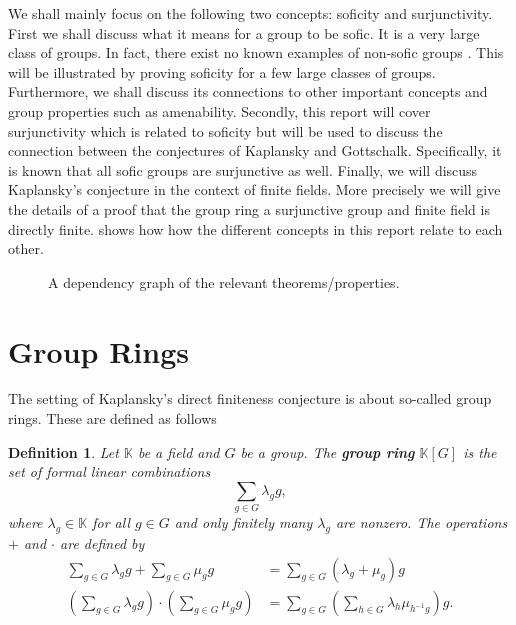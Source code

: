 \documentclass[titlepage, a4paper]{article}
\newcommand{\F}{\mathbb{F}}
\newtheorem{definition}[theorem]{Definition}
\theoremstyle{remark}
\begin{document}
We shall mainly focus on the following two concepts: soficity and surjunctivity. First we shall discuss what it means for a group to be sofic. It is a very large class of groups. In fact, there exist no known examples of non-sofic groups \cite[introduction]{weiss_2000}. This will be illustrated by proving soficity for a few large classes of groups. Furthermore, we shall discuss its connections to other important concepts and group properties such as amenability. Secondly, this report will cover surjunctivity which is related to soficity but will be used to discuss the connection between the conjectures of Kaplansky and Gottschalk. Specifically, it is known that all sofic groups are surjunctive as well.
Finally, we will discuss Kaplansky's conjecture in the context of finite fields. More precisely we will give the details of a proof that the group ring a surjunctive group and finite field is directly finite.  shows how how the different concepts in this report relate to each other.


\begin{figure}[h]
	\centering
{}
\caption{A dependency graph of the relevant theorems/properties. }
\label{fig:dependency_graph}
\end{figure}
\section{Group Rings}\label{sec:group_rings} 

The setting of Kaplansky's direct finiteness conjecture is about so-called group rings. These are defined as follows


\begin{definition}\label{def:group_ring}
	Let $\mathbb K$ be a field and $G$ be a group. The \textbf{group ring} $\mathbb K[G]$ is the set of formal linear combinations
    \[
        \sum_{g \in G} \lambda_g g,
    \]
    where $\lambda_g \in \mathbb K$ for all $g \in G$ and only finitely many $\lambda_g$ are nonzero. The operations $+$ and $\cdot$ are defined by
    \begin{align*}
        \sum_{g \in G} \lambda_g g + \sum_{g \in G} \mu_g g
        &= \sum_{g \in G} (\lambda_g+\mu_g) g \\
        \left(\sum_{g \in G} \lambda_g g \right) \cdot \left(\sum_{g \in G} \mu_g g \right)
        &= \sum_{g \in G} \left( \sum_{h \in G} \lambda_{h} \mu_{h^{-1}g} \right) g.
    \end{align*}
\end{definition}
\end{document}
